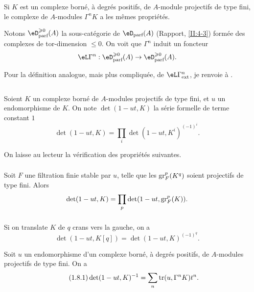 \subsection{}\label{III:1-6}

Si $K$ est un complexe borné, à degrés positifs, de $A$-module projectifs 
de type fini, le complexe de $A$-modules $\Gamma^n K$ a les mêmes 
propriétés. 

Notons $\eD_\text{parf}^{\geqslant 0}(A)$ la sous-catégorie de 
$\eD_\text{parf}(A)$ (Rapport, \ref{II:4-3}) formée des complexes de 
tor-dimension $\leqslant 0$. On voit que $\Gamma^n$ induit un foncteur 
\[
  \eL\Gamma^n : \eD_\text{parf}^{\geqslant 0}(A) \to \eD_\text{parf}^{\geqslant 0}(A) \text{.}
\]

Pour la définition analogue, mais plus compliquée, de 
$\eL\Gamma_\text{ext}^n$, je renvoie à \cite[XVII 5.5.14]{sga4}. 





\subsection{}\label{III:1-7}

Soient $K$ un complexe borné de $A$-modules projectifs de type fini, et $u$ 
un endomorphisme de $K$. On note $\det(1-u t,K)$ la série formelle de terme 
constant $1$ 
\[
  \det(1-u t,K) = \prod_i \det(1-u t,K^i)^{(-1)^i} \text{.}
\]

On laisse au lecteur la vérification des propriétés suivantes. 


\subsubsection{}\label{III:1-7-1}

Soit $F$ une filtration finie stable par $u$, telle que les $\operatorname{gr}_F^p(K^q)$ 
soient projectifs de type fini. Alors 
\[
  \det(1-u t,K) = \prod_p \det(1-u t,\operatorname{gr}_F^p(K)) \text{.}
\]


\subsubsection{}\label{III:1-7-2}

Si on translate $K$ de $q$ crans vers la gauche, on a 
\[
  \det(1-u t,K[q]) = \det(1-u t,K)^{(-1)^q} \text{.}
\]





\begin{proposition_}\label{III:1-8}
Soit $u$ un endomorphisme d'un complexe borné, à degrés positifs, de 
$A$-modules projectifs de type fini. On a \
\begin{equation*}\tag{1.8.1}\label{III:eq:1-8-1}
  \det(1-u t,K)^{-1} = \sum_n \operatorname{tr}(u,\Gamma^n K) t^n \text{.}
\end{equation*}
\end{proposition_}

